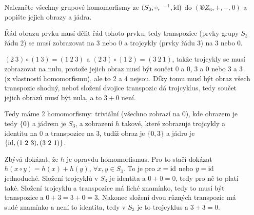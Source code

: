 \documentclass[12pt]{article}                   %
\begin{document}
\pagebreak

    \begin{priklad}[5.3]
        Nalezněte všechny grupové homomorfismy ze $(S_3, \circ, \ ^{-1}, \operatorname{id})$ do $(®Z_6, +, -, 0)$ a popište jejich obrazy a jádra.

        \begin{reseni}
            Řád obrazu prvku musí dělit řád tohoto prvku, tedy transpozice (prvky grupy $S_3$ řádu 2) se musí zobrazovat na $3$ nebo $0$ a trojcykly (prvky řádu 3) na $3$ nebo $0$.

            $(2\ 3) \circ (1\ 3) = (1\ 2\ 3)$ a $(2\ 3) \circ (1\ 2) = (3\ 2\ 1)$, takže trojcykly se musí zobrazovat na nulu, protože jejich obraz musí být součet 0 a 0, 3 a 0 nebo 3 a 3 (z vlastností homomorfismu), ale to 2 a 4 nejsou. Díky tomu musí být obraz všech transpozic shodný, neboť složení dvojice transpozic dá trojcyklus, tedy součet jejich obrazů musí být nula, a to $3 + 0$ není.

            Tedy máme 2 homomorfismy: triviální (všechno zobrazí na $0$), kde obrazem je tedy $\{0\}$ a jádrem je $S_3$, a zobrazení $h$ takové, které zobrazuje trojcykly a identitu na $0$ a transpozice na 3, tudíž obraz je $\{0, 3\}$ a jádro je $\{\id, (1\ 2\ 3), (3\ 2\ 1)\}$.

            Zbývá dokázat, že $h$ je opravdu homomorfismus. Pro to stačí dokázat $h(x\circ y) = h(x) + h(y)$, $\forall x, y \in S_3$. To je pro $x = \operatorname{id}$ nebo $y=\operatorname{id}$ jednoduché. Složení trojcyklů v $S_3$ je identita a $0 + 0 = 0$, tedy pro ně to platí také. Složení trojcyklu a transpozice má liché znamínko, tedy to musí být transpozice a $0 + 3 = 3 + 0 = 3$. Nakonec složení dvou různých transpozic má sudé znamínko a není to identita, tedy v $S_3$ je to trojcyklus a $3 + 3 = 0$.
        \end{reseni}
    \end{priklad}
\end{document}
